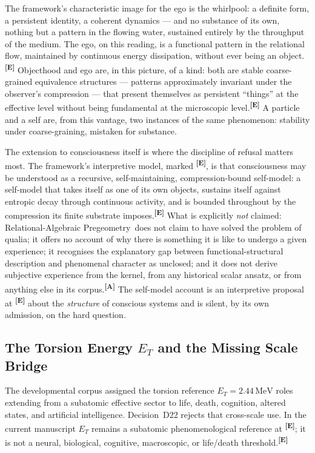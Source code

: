 \documentclass[12pt,a4paper,twoside]{article}
\theoremstyle{plain}
\theoremstyle{definition}
\theoremstyle{remark}
\newcommand{\ProjectShort}{Relational-Algebraic Pregeometry}
\newcommand{\RAP}{\ProjectShort}
\newcommand{\MeV}{\,\mathrm{MeV}}
\newcommand{\catmark}[1]{\textsuperscript{\textsf{\textbf{[#1]}}}}
\newcommand{\ETorsion}{2.44\MeV} %
\begin{document}
The framework's characteristic image for the ego is the whirlpool: a
definite form, a persistent identity, a coherent dynamics --- and no
substance of its own, nothing but a pattern in the flowing water,
sustained entirely by the throughput of the medium. The ego, on this
reading, is a functional pattern in the relational flow, maintained by
continuous energy dissipation, without ever being an object.\catmark{E}
Objecthood and ego are, in this picture, of a kind: both are stable
coarse-grained equivalence structures --- patterns approximately
invariant under the observer's compression --- that present themselves
as persistent ``things'' at the effective level without being
fundamental at the microscopic level.\catmark{E} A particle and a self
are, from this vantage, two instances of the same phenomenon: stability
under coarse-graining, mistaken for substance.

The extension to consciousness itself is where the discipline of refusal
matters most. The framework's interpretive model, marked \catmark{E}, is
that consciousness may be understood as a recursive, self-maintaining,
compression-bound self-model: a self-model that takes itself as one of
its own objects, sustains itself against entropic decay through
continuous activity, and is bounded throughout by the compression its
finite substrate imposes.\catmark{E} What is explicitly \emph{not}
claimed: \RAP\ does not claim to have solved the problem of qualia; it
offers no account of why there is something it is like to undergo a
given experience; it recognises the explanatory gap between
functional-structural description and phenomenal character as unclosed;
and it does not derive subjective experience from the kernel, from any
historical scalar ansatz, or from anything else in its corpus.\catmark{A}
The self-model account is an interpretive proposal at \catmark{E} about the
\emph{structure} of conscious systems
and is silent, by its own admission, on the hard question.

\subsection{The Torsion Energy \texorpdfstring{$E_T$}{E\_T} and the Missing Scale Bridge}
\label{subsec:et-scale-bridge}

The developmental corpus assigned the torsion reference
$E_T=\ETorsion$ roles extending from a subatomic effective sector to life,
death, cognition, altered states, and artificial intelligence. Decision~D22
rejects that cross-scale use. In the current manuscript $E_T$ remains a
subatomic phenomenological reference at \catmark{E}; it is not a neural,
biological, cognitive, macroscopic, or life/death threshold.\catmark{E}
\end{document}

